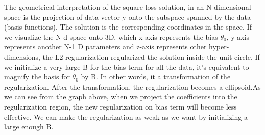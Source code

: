 \documentclass{article}
\begin{document}
The geometrical interpretation of the square loss solution, in an N-dimensional space is the projection of data vector y onto the subspace spanned by the data (basis functions). The solution is the corresponding coordinates in the space. If we visualize the N-d space onto 3D, which x-axis represents the bias $\theta_0$, y-axis represents another N-1 D parameters and z-axis represents other hyper-dimensions, the L2 regularization regularized the solution inside the unit circle. If we initialize a very large B for the bias term for all the data, it's equivalent to magnify the basis for $\theta_0$ by B. In other words, it a transformation of the regularization. After the transformation, the regularization becomes a ellipsoid.As we can see from the graph above, when we project the coefficients into the regularization region,  the new regularization on bias term will become less effective. We can make the regularization as weak as we want by initializing a large enough B. 
\end{document}
